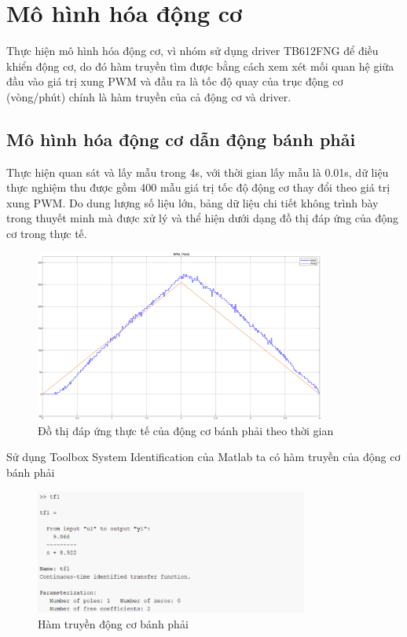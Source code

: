      \section{Mô hình hóa động cơ}
          \hspace*{0.6cm}Thực hiện mô hình hóa động cơ, vì nhóm sử dụng driver TB612FNG để điều khiển động cơ, do đó hàm truyền tìm được bằng cách xem xét mối quan hệ giữa đầu vào giá trị xung PWM và đầu ra là tốc độ quay của trục động cơ (vòng/phút) chính là hàm truyền của cả động cơ và driver.   
          \subsection{Mô hình hóa động cơ dẫn động bánh phải}    
               \hspace*{0.6cm}Thực hiện quan sát và lấy mẫu trong 4s, với thời gian lấy mẫu là 0.01s, dữ liệu thực nghiệm thu được gồm 400 mẫu giá trị tốc độ động cơ thay đổi theo giá trị xung PWM. Do dung lượng số liệu lớn, 
               bảng dữ liệu chi tiết không trình bày trong thuyết minh mà được xử lý và thể hiện dưới dạng đồ thị đáp ứng của động cơ trong thực tế. 
               \begin{figure}[H]
                    \centering
                    \includegraphics[width=0.85\textwidth]{pictures/chapter5/CJGB1_response.png}
                    \caption{Đồ thị đáp ứng thực tế của động cơ bánh phải theo thời gian}
                    \label{CJGB1_response}
               \end{figure}  
               \hspace*{0.6cm}Sử dụng Toolbox System Identification của Matlab ta có hàm truyền của động cơ bánh phải 
               \begin{figure}[H]
                    \centering
                    \includegraphics[width=0.8\textwidth]{pictures/chapter5/CJGB1_tf.png}
                    \caption{Hàm truyền động cơ bánh phải}
                    \label{CJGB1_tf}
               \end{figure} 
